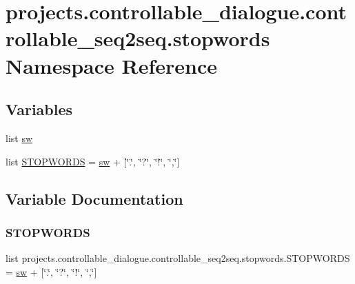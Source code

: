 \hypertarget{namespaceprojects_1_1controllable__dialogue_1_1controllable__seq2seq_1_1stopwords}{}\section{projects.\+controllable\+\_\+dialogue.\+controllable\+\_\+seq2seq.\+stopwords Namespace Reference}
\label{namespaceprojects_1_1controllable__dialogue_1_1controllable__seq2seq_1_1stopwords}
\subsection*{Variables}
\begin{DoxyCompactItemize}
\item 
list \hyperlink{namespaceprojects_1_1controllable__dialogue_1_1controllable__seq2seq_1_1stopwords_a37546a376847cc9613f2de3702513ffc}{sw}
\item 
list \hyperlink{namespaceprojects_1_1controllable__dialogue_1_1controllable__seq2seq_1_1stopwords_aa57d65385cba53ed59f6a6a338a110a3}{S\+T\+O\+P\+W\+O\+R\+DS} = \hyperlink{namespaceprojects_1_1controllable__dialogue_1_1controllable__seq2seq_1_1stopwords_a37546a376847cc9613f2de3702513ffc}{sw} + \mbox{[}\char`\"{}.\char`\"{}, \char`\"{}?\char`\"{}, \char`\"{}!\char`\"{}, \char`\"{},\char`\"{}\mbox{]}
\end{DoxyCompactItemize}


\subsection{Variable Documentation}
\mbox{\label{namespaceprojects_1_1controllable__dialogue_1_1controllable__seq2seq_1_1stopwords_aa57d65385cba53ed59f6a6a338a110a3}} 
\subsubsection{\texorpdfstring{S\+T\+O\+P\+W\+O\+R\+DS}{STOPWORDS}}
{\footnotesize\ttfamily list projects.\+controllable\+\_\+dialogue.\+controllable\+\_\+seq2seq.\+stopwords.\+S\+T\+O\+P\+W\+O\+R\+DS = \hyperlink{namespaceprojects_1_1controllable__dialogue_1_1controllable__seq2seq_1_1stopwords_a37546a376847cc9613f2de3702513ffc}{sw} + \mbox{[}\char`\"{}.\char`\"{}, \char`\"{}?\char`\"{}, \char`\"{}!\char`\"{}, \char`\"{},\char`\"{}\mbox{]}}

